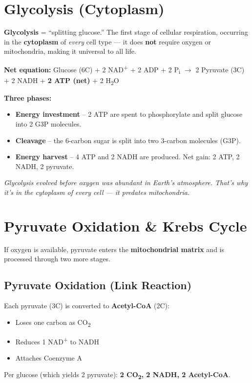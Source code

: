 \documentclass[11pt, letterpaper]{article}
\begin{document}
\section*{Glycolysis (Cytoplasm)}

\textbf{Glycolysis} = ``splitting glucose.'' The first stage of cellular respiration, occurring
in the \textbf{cytoplasm} of \emph{every} cell type --- it does \textbf{not} require oxygen
or mitochondria, making it universal to all life.

\textbf{Net equation:} \quad Glucose (6C) + 2 NAD\textsuperscript{+} + 2 ADP + 2 P\textsubscript{i}
$\to$ 2 Pyruvate (3C) + 2 NADH + \textbf{2 ATP (net)} + 2 H\textsubscript{2}O

\textbf{Three phases:}
\begin{itemize}[noitemsep]
  \item \textbf{Energy investment} -- 2 ATP are spent to phosphorylate and split glucose into 2 G3P molecules.
  \item \textbf{Cleavage} -- the 6-carbon sugar is split into two 3-carbon molecules (G3P).
  \item \textbf{Energy harvest} -- 4 ATP and 2 NADH are produced. Net gain: 2 ATP, 2 NADH, 2 pyruvate.
\end{itemize}

\textit{Glycolysis evolved before oxygen was abundant in Earth's atmosphere. That's why it's
in the cytoplasm of every cell --- it predates mitochondria.}

\section*{Pyruvate Oxidation \& Krebs Cycle}

If oxygen is available, pyruvate enters the \textbf{mitochondrial matrix} and is processed
through two more stages.

\subsection*{Pyruvate Oxidation (Link Reaction)}

Each pyruvate (3C) is converted to \textbf{Acetyl-CoA} (2C):
\begin{itemize}[noitemsep]
  \item Loses one carbon as CO\textsubscript{2}
  \item Reduces 1 NAD\textsuperscript{+} to NADH
  \item Attaches Coenzyme A
\end{itemize}
Per glucose (which yields 2 pyruvate): \textbf{2 CO\textsubscript{2}, 2 NADH, 2 Acetyl-CoA}.
\end{document}
